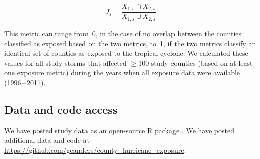 \begin{equation} 
J_s = \frac{X_{1,s} \cap X_{2,s}}{X_{1,s} \cup X_{2,s}}
\end{equation}

\noindent This metric can range from~0, in the case of no overlap between the
counties classified as exposed based on the two metrics, to~1, if
the two metrics classify an identical set of counties as exposed to the
tropical cyclone. We calculated these values for all study storms that affected
$\ge$100 study counties (based on at least one exposure metric) during the
years when all exposure data were available (1996\,--\,2011).

\subsection*{Data and code access}

We have posted study data as an open-source R package
\cite{hurricaneexposuredata}. We have posted additional data and code at
\url{https://github.com/geanders/county_hurricane_exposure}.
